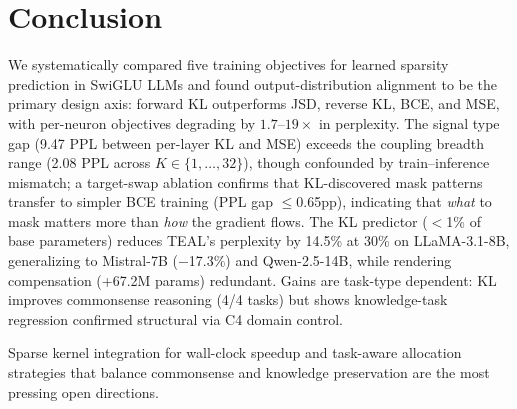 \section{Conclusion}
\label{sec:conclusion}

We systematically compared five training objectives for learned sparsity prediction in SwiGLU LLMs and found output-distribution alignment to be the primary design axis: forward KL outperforms JSD, reverse KL, BCE, and MSE, with per-neuron objectives degrading by $1.7$--$19\times$ in perplexity.
The signal type gap (9.47 PPL between per-layer KL and MSE) exceeds the coupling breadth range (2.08 PPL across $K \in \{1,\ldots,32\}$), though confounded by train--inference mismatch; a target-swap ablation confirms that KL-discovered mask patterns transfer to simpler BCE training (PPL gap $\leq$0.65pp), indicating that \emph{what} to mask matters more than \emph{how} the gradient flows.
The KL predictor ($<$1\% of base parameters) reduces TEAL's perplexity by 14.5\% at 30\% on LLaMA-3.1-8B, generalizing to Mistral-7B ($-$17.3\%) and Qwen-2.5-14B, while rendering compensation (+67.2M params) redundant.
Gains are task-type dependent: KL improves commonsense reasoning (4/4 tasks) but shows knowledge-task regression confirmed structural via C4 domain control.

Sparse kernel integration for wall-clock speedup and task-aware allocation strategies that balance commonsense and knowledge preservation are the most pressing open directions.
